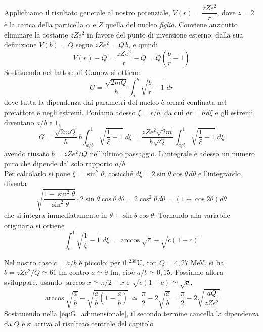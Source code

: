 Applichiamo il risultato generale al nostro potenziale, $V(r) = \dfrac{zZe^2}{r}$, dove $z = 2$ è la carica della particella $\alpha$ e $Z$ quella del nucleo \emph{figlio}. Conviene anzitutto eliminare la costante $zZe^2$ in favore del punto di inversione esterno: dalla sua definizione $V(b) = Q$ segue $zZe^2 = Q\,b$, e quindi
%
\begin{equation*}
    V(r) - Q = \frac{zZe^2}{r} - Q = Q\left(\frac{b}{r} - 1\right)
\end{equation*}
Sostituendo nel fattore di Gamow si ottiene
%
\begin{equation}
    G = \frac{\sqrt{2mQ}}{\hbar}\int_a^b \sqrt{\frac{b}{r} - 1} \; dr
    \label{eq:G_coulomb}
\end{equation}
dove tutta la dipendenza dai parametri del nucleo è ormai confinata nel prefattore e negli estremi. Poniamo adesso $\xi = r/b$, da cui $dr = b \, d\xi$ e gli estremi diventano $a/b$ e $1$,
%
\begin{equation}
    G = \frac{\sqrt{2mQ}}{\hbar}\,b \int_{a/b}^{1} \sqrt{\frac{1}{\xi} - 1} \; d\xi = \frac{zZe^2\sqrt{2m}}{\hbar \sqrt{Q}} \int_{a/b}^{1} \sqrt{\frac{1}{\xi} - 1} \; d\xi
    \label{eq:G_adimensionale}
\end{equation}
avendo riusato $b = zZe^2/Q$ nell'ultimo passaggio. L'integrale è adesso un numero puro che dipende dal solo rapporto $a/b$.\\

Per calcolarlo si pone $\xi = \sin^2\theta$, cosicché $d\xi = 2\sin\theta\cos\theta \, d\theta$ e l'integrando diventa
%
\begin{equation*}
    \sqrt{\frac{1-\sin^2\theta}{\sin^2\theta}} \cdot 2\sin\theta\cos\theta \, d\theta = 2\cos^2\theta \, d\theta = \left(1 + \cos 2\theta\right) d\theta
\end{equation*}
che si integra immediatamente in $\theta + \sin\theta\cos\theta$. Tornando alla variabile originaria si ottiene
%
\begin{equation}
    \int_{c}^{1} \sqrt{\frac{1}{\xi} - 1} \; d\xi = \arccos\sqrt{c} - \sqrt{c\left(1-c\right)}
    \label{eq:integrale_notevole}
\end{equation}

Nel nostro caso $c = a/b$ è piccolo: per il $^{238}\mathrm{U}$, con $Q = 4{,}27$ MeV, si ha $b = zZe^2/Q \simeq 61$ fm contro $a \simeq 9$ fm, cioè $a/b \simeq 0{,}15$. Possiamo allora sviluppare, usando $\arccos x \simeq \pi/2 - x$ e $\sqrt{c(1-c)} \simeq \sqrt{c}$,
%
\begin{equation}
    \arccos\sqrt{\frac{a}{b}} - \sqrt{\frac{a}{b}\left(1 - \frac{a}{b}\right)} \ \simeq \ \frac{\pi}{2} - 2\sqrt{\frac{a}{b}} = \frac{\pi}{2} - 2\sqrt{\frac{aQ}{zZe^2}}
    \label{eq:sviluppo}
\end{equation}
Sostituendo nella \eqref{eq:G_adimensionale}, il secondo termine cancella la dipendenza da $Q$ e si arriva al risultato centrale del capitolo

